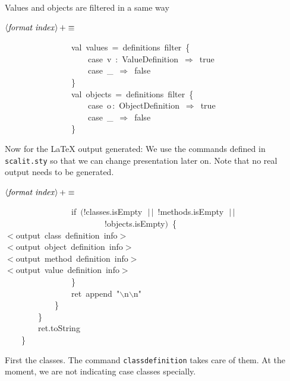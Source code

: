 \documentclass[a4paper,12pt]{article}
\begin{document}
Values and objects are filtered in a same way

$\left<\mbox{\emph{format index}}\right>+\equiv$
\begin{program}~~~~~~~~~~~~~~~~{\vem val}~values~=~definitions~filter~{\small\{}
\\~~~~~~~~~~~~~~~~~~~~{\vem case}~v~{\rm :}~ValueDefinition~$\Rightarrow$~{\vem true}
\\~~~~~~~~~~~~~~~~~~~~{\vem case}~\_~$\Rightarrow$~{\vem false}
\\~~~~~~~~~~~~~~~~{\small\}}
\\~~~~~~~~~~~~~~~~{\vem val}~objects~=~definitions~filter~{\small\{}
\\~~~~~~~~~~~~~~~~~~~~{\vem case}~o\,{\rm :}~ObjectDefinition~$\Rightarrow$~{\vem true}
\\~~~~~~~~~~~~~~~~~~~~{\vem case}~\_~$\Rightarrow$~{\vem false}
\\~~~~~~~~~~~~~~~~{\small\}}
\\[0.5em]\end{program}


Now for the LaTeX output generated: We use the commands defined
in \texttt{scalit.sty} so that we can change presentation later on. Note that
no real output needs to be generated.

$\left<\mbox{\emph{format index}}\right>+\equiv$
\begin{program}~~~~~~~~~~~~~~~~{\vem if}~$($!classes.isEmpty~$\,|$$\,|$~!methods.isEmpty~$\,|$$\,|$
\\~~~~~~~~~~~~~~~~~~~~~~~~!objects.isEmpty$)$~{\small\{}
\\$<$output~{\vem class}~definition~info$>$
\\$<$output~{\vem object}~definition~info$>$
\\$<$output~method~definition~info$>$
\\$<$output~value~definition~info$>$
\\~~~~~~~~~~~~~~~~{\small\}}
\\~~~~~~~~~~~~~~~~ret~append~"$\backslash$n$\backslash$n"
\\~~~~~~~~~~~~{\small\}}
\\~~~~~~~~{\small\}}
\\[0.5em]~~~~~~~~ret.toString
\\~~~~{\small\}}
\\[0.5em]\end{program}


First the classes. The command \texttt{classdefinition} takes care
of them. At the moment, we are not indicating case classes specially.
\end{document}
